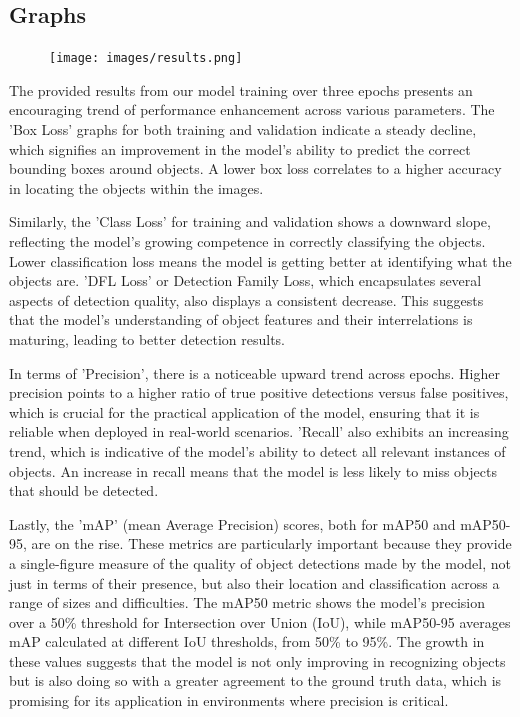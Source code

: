 \documentclass[10pt]{extarticle}
\begin{document}
\subsection{Graphs}


\begin{figure}[H]
    \centering
    \texttt{[image: images/results.png]}
    \end{figure}

The provided results from our model training over three epochs presents an encouraging trend of performance enhancement across various parameters. The 'Box Loss' graphs for both training and validation indicate a steady decline, which signifies an improvement in the model's ability to predict the correct bounding boxes around objects. A lower box loss correlates to a higher accuracy in locating the objects within the images.

Similarly, the 'Class Loss' for training and validation shows a downward slope, reflecting the model's growing competence in correctly classifying the objects. Lower classification loss means the model is getting better at identifying what the objects are. 'DFL Loss' or Detection Family Loss, which encapsulates several aspects of detection quality, also displays a consistent decrease. This suggests that the model's understanding of object features and their interrelations is maturing, leading to better detection results.

In terms of 'Precision', there is a noticeable upward trend across epochs. Higher precision points to a higher ratio of true positive detections versus false positives, which is crucial for the practical application of the model, ensuring that it is reliable when deployed in real-world scenarios. 'Recall' also exhibits an increasing trend, which is indicative of the model's ability to detect all relevant instances of objects. An increase in recall means that the model is less likely to miss objects that should be detected.

Lastly, the 'mAP' (mean Average Precision) scores, both for mAP50 and mAP50-95, are on the rise. These metrics are particularly important because they provide a single-figure measure of the quality of object detections made by the model, not just in terms of their presence, but also their location and classification across a range of sizes and difficulties. The mAP50 metric shows the model's precision over a 50\% threshold for Intersection over Union (IoU), while mAP50-95 averages mAP calculated at different IoU thresholds, from 50\% to 95\%. The growth in these values suggests that the model is not only improving in recognizing objects but is also doing so with a greater agreement to the ground truth data, which is promising for its application in environments where precision is critical.
\end{document}
